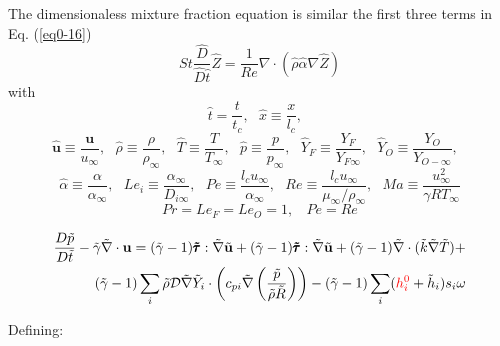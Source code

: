 \documentclass[preprint,12pt,authoryear]{elsarticle}
\begin{document}
{The dimensionaless mixture fraction equation is similar the first three terms in Eq. (\ref{eq0-16})
\begin{equation}
     St\frac{\hat{D}}{\hat{D} \hat{t}} \hat{Z}
     = 
    \frac{1}{Re} \nabla \cdot (  \hat{\rho} \hat{\alpha}  \nabla \hat{Z})  
\label{eq0-18}
\end{equation}
with
%
\[
    \hat{t} = \frac{t}{t_c}, \ \ \ 
    \hat{x} \equiv \frac{x}{l_c}, \ \ \ 
\]
\[
    \pmb{\hat{u}} \equiv \frac{\pmb{u} }{ u_{\infty} }, \ \ \
    \hat{\rho}    \equiv \frac{\rho    }{ \rho_{\infty}}, \ \ \ 
    \hat{T}       \equiv \frac{T       }{ T_{\infty}}, \ \ \ 
    \hat{p}       \equiv \frac{p       }{ p_{\infty}}, \ \ \ 
    \hat{Y}_F     \equiv \frac{Y_F     }{ Y_{F\infty}}, \ \ \
    \hat{Y}_O     \equiv \frac{Y_O     }{ Y_{O-\infty}}, \ \ \ 
\]
\[
    \hat{\alpha} 
         \equiv \frac{\alpha           }
                     {\alpha_{\infty}  }, \ \ \ 
    Le_i \equiv \frac{ \alpha_{\infty} }
                     { D_{i\infty}     } , \ \ \ 
    Pe \equiv \frac{ l_c u_{\infty}    }
                   { \alpha_{\infty}   },  \ \ \ 
    Re \equiv \frac{ l_c u_{\infty}    } 
                   { \mu_{\infty} / \rho_{\infty} },  \ \ \ 
    Ma \equiv \frac{u_{\infty}^2}{\gamma R T_{\infty}}
\]
\[
    Pr=Le_F=Le_O=1,\ \ \ \ Pe = Re
\]
}

\newpage

\begin{equation}
\begin{split}
        \frac{D \tilde{p}}{D\tilde{t}}
	-
	\tilde{\gamma}
	\tilde{\nabla}\cdot{\mathbf{u}}
        =
	(\tilde{\gamma}-1)
        \pmb{\tilde{\tau}}:\tilde{\nabla} \tilde{\mathbf{u}} 
        + 
	(\tilde{\gamma}-1)
        \pmb{\tilde{\tau}}:\tilde{\nabla} \tilde{\mathbf{u}} 
        + 
	(\tilde{\gamma}-1)
        \tilde{\nabla} \cdot (\tilde{k}\tilde{\nabla} \tilde{T})
        +
	\\
	(\tilde{\gamma}-1)
        \sum\limits_i 
        \tilde{\rho}
        \mathcal{D}
        \tilde{\nabla}
        \tilde{Y}_i     
        \cdot
        \left(
                c_{pi}
                \tilde{\nabla}
                \left(
                	\frac{\tilde{p}}{\tilde{\rho}\tilde{R}}
                \right)
        \right)
	- 
	(\tilde{\gamma}-1)
        \sum\limits_i
        ({\color{red} h_i^0} + \tilde{h}_i)
        s_i	
        \omega
\end{split}
\end{equation}

Defining:
\end{document}
